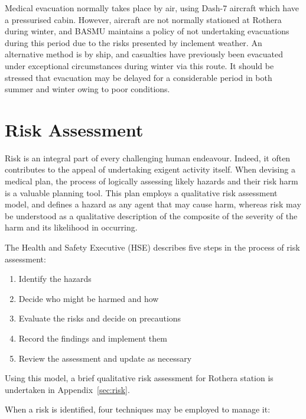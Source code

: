\documentclass[12pt,a4paper]{article}
\begin{document}
Medical evacuation normally takes place by air, using Dash-7 aircraft which have a pressurised cabin. However, aircraft are not normally stationed at Rothera during winter, and BASMU maintains a policy of not undertaking evacuations during this period due to the risks presented by inclement weather. An alternative method is by ship, and casualties have previously been evacuated under exceptional circumstances during winter via this route. It should be stressed that evacuation may be delayed for a considerable period in both summer and winter owing to poor conditions.

\section{Risk Assessment}

Risk is an integral part of every challenging human endeavour. Indeed, it often contributes to the appeal of undertaking exigent activity itself. When devising a medical plan, the process of logically assessing likely hazards and their risk harm is a valuable planning tool. This plan employs a qualitative risk assessment model, and defines a hazard as any agent that may cause harm, whereas risk may be understood as a qualitative description of the composite of the severity of the harm and its likelihood in occurring.\cite{TheNationalPatientSafetyAgency:2007ud}

The Health and Safety Executive (HSE) describes five steps\cite{HSE:2012tp} in the process of risk assessment:

\begin{enumerate}
    \item Identify the hazards
    \item Decide who might be harmed and how
    \item Evaluate the risks and decide on precautions
    \item Record the findings and implement them
    \item Review the assessment and update as necessary
\end{enumerate}

Using this model, a brief qualitative risk assessment for Rothera station is undertaken in Appendix~\ref{sec:risk}.

When a risk is identified, four techniques may be employed to manage it:
\end{document}
